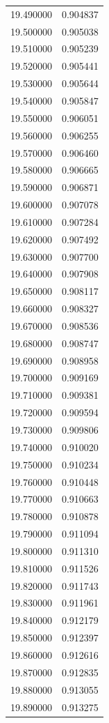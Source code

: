 \begin{tabular}{rr}
19.490000 & 0.904837 \\
19.500000 & 0.905038 \\
19.510000 & 0.905239 \\
19.520000 & 0.905441 \\
19.530000 & 0.905644 \\
19.540000 & 0.905847 \\
19.550000 & 0.906051 \\
19.560000 & 0.906255 \\
19.570000 & 0.906460 \\
19.580000 & 0.906665 \\
19.590000 & 0.906871 \\
19.600000 & 0.907078 \\
19.610000 & 0.907284 \\
19.620000 & 0.907492 \\
19.630000 & 0.907700 \\
19.640000 & 0.907908 \\
19.650000 & 0.908117 \\
19.660000 & 0.908327 \\
19.670000 & 0.908536 \\
19.680000 & 0.908747 \\
19.690000 & 0.908958 \\
19.700000 & 0.909169 \\
19.710000 & 0.909381 \\
19.720000 & 0.909594 \\
19.730000 & 0.909806 \\
19.740000 & 0.910020 \\
19.750000 & 0.910234 \\
19.760000 & 0.910448 \\
19.770000 & 0.910663 \\
19.780000 & 0.910878 \\
19.790000 & 0.911094 \\
19.800000 & 0.911310 \\
19.810000 & 0.911526 \\
19.820000 & 0.911743 \\
19.830000 & 0.911961 \\
19.840000 & 0.912179 \\
19.850000 & 0.912397 \\
19.860000 & 0.912616 \\
19.870000 & 0.912835 \\
19.880000 & 0.913055 \\
19.890000 & 0.913275 \\

\end{tabular}
